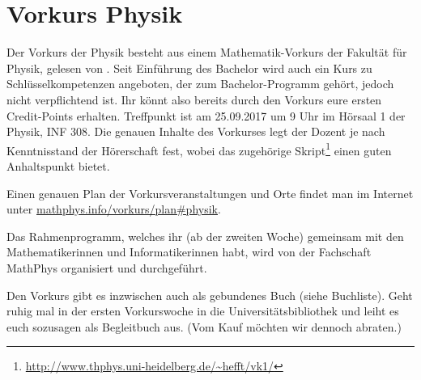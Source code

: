 \section{Vorkurs Physik}
Der Vorkurs der Physik besteht aus einem Mathematik-Vorkurs der Fakultät für Physik, gelesen von \dozentvorkurs. Seit Einführung des Bachelor wird auch ein Kurs zu Schlüsselkompetenzen angeboten, der zum Bachelor-Programm gehört, jedoch nicht verpflichtend ist. Ihr könnt also bereits durch den Vorkurs eure ersten Credit-Points erhalten. Treffpunkt ist am 25.09.2017 um 9 Uhr im Hörsaal 1 der Physik, \Gls{INF} 308. Die genauen Inhalte des Vorkurses legt der Dozent je nach Kenntnisstand der Hörerschaft fest, wobei das zugehörige Skript\footnote{\url{http://www.thphys.uni-heidelberg.de/~hefft/vk1/}} einen guten Anhaltspunkt bietet.

Einen genauen Plan der Vorkursveranstaltungen und Orte findet man im Internet  unter \url{mathphys.info/vorkurs/plan\#physik}.

Das Rahmenprogramm, welches ihr (ab der zweiten Woche) gemeinsam mit den Mathematikerinnen und Informatikerinnen habt, wird von der Fachschaft MathPhys organisiert und durchgeführt.

Den Vorkurs gibt es inzwischen auch als gebundenes Buch (siehe Buchliste). Geht ruhig mal in der ersten Vorkurswoche in die Universitätsbibliothek und leiht es euch sozusagen als Begleitbuch aus. (Vom Kauf möchten wir dennoch abraten.)
